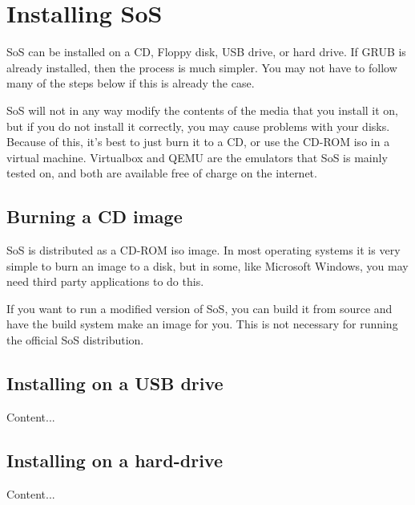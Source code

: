 \chapter{Installing SoS}
SoS can be installed on a CD, Floppy disk, USB drive, or hard drive. If GRUB is already installed, then the
process is much simpler. You may not have to follow many of the steps below if this is already the case.

SoS will not in any way modify the contents of the media that you install it on, but if you do not install it
correctly, you may cause problems with your disks. Because of this, it's best to just burn it to a CD, or
use the CD-ROM iso in a virtual machine. Virtualbox and QEMU are the emulators that SoS is mainly tested on, and
both are available free of charge on the internet.

\section{Burning a CD image}
SoS is distributed as a CD-ROM iso image. In most operating systems it is very simple to burn an image to a disk,
but in some, like Microsoft Windows, you may need third party applications to do this.

If you want to run a modified version of SoS, you can build it from source and have the build system make an
image for you. This is not necessary for running the official SoS distribution.

\section{Installing on a USB drive}
Content...

\section{Installing on a hard-drive}
Content...

